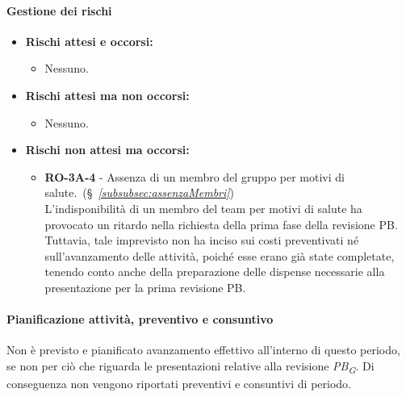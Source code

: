 \paragraph{Gestione dei rischi} 
\begin{itemize}
    \item \textbf{Rischi attesi e occorsi:}
\begin{itemize}
    \item Nessuno.
\end{itemize}
\item \textbf{Rischi attesi ma non occorsi:}
    \begin{itemize}
        \item Nessuno.
    \end{itemize}
    \item \textbf{Rischi non attesi ma occorsi:}
    \begin{itemize}
        \item \textbf{RO-3A-4} - Assenza di un membro del gruppo per motivi di salute.~(\S~\textit{\ref{subsubsec:assenzaMembri}}) \\
        L'indisponibilità di un membro del team per motivi di salute ha provocato un ritardo nella richiesta della prima fase della revisione PB. Tuttavia, tale imprevisto non ha inciso sui costi preventivati né sull'avanzamento delle attività, poiché esse erano già state completate, tenendo conto anche della preparazione delle dispense necessarie alla presentazione per la prima revisione PB.
    \end{itemize}
\end{itemize}

\paragraph{Pianificazione attività, preventivo e consuntivo}
Non è previsto e pianificato avanzamento effettivo all’interno di questo periodo, se non per ciò che riguarda le presentazioni relative alla revisione \textit{PB}\textsubscript{\textit{G}}.
Di conseguenza non vengono riportati preventivi e consuntivi di periodo.